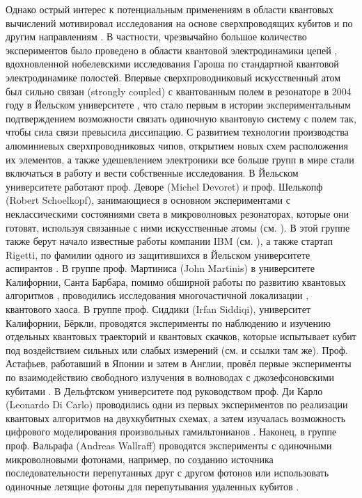 \documentclass[14pt, a4paper]{extarticle}
\begin{document}
Однако острый интерес к потенциальным применениям в области квантовых вычислений мотивировал исследования на основе сверхпроводящих кубитов и по другим направлениям \cite{kjaergaard2020superconducting}. В частности, чрезвычайно большое количество экспериментов было проведено в области квантовой электродинамики цепей \cite{blais2020quantum}, вдохновленной нобелевскими исследования Гароша \cite{haroche2013nobel} по стандартной квантовой электродинамике полостей. Впервые сверхпроводниковый искусственный атом был сильно связан (strongly coupled) с квантованным полем в резонаторе в 2004 году в Йельском университете \cite{wallraff2004strong}, что стало первым в истории экспериментальным подтверждением возможности связать одиночную квантовую систему с полем так, чтобы сила связи превысила диссипацию. С развитием технологии производства алюминиевых сверхпроводниковых чипов, открытием новых схем расположения их элементов, а также удешевлением электроники все больше групп в мире стали включаться в работу и вести собственные исследования. В Йельском университете работают проф. Деворе (Michel Devoret) и проф. Шелькопф (Robert Schoelkopf), занимающиеся в основном экспериментами с неклассическими состояниями света в микроволновых резонаторах, которые они готовят, используя связанные с ними искусственные атомы (см. \cite{vlastakis2013deterministically, mirrahimi2014dynamically}). В этой группе также берут начало известные работы компании IBM (см. \cite{jurcevic2020demonstration}), а также стартап Rigetti, по фамилии одного из защитившихся в Йельском университете аспирантов \cite{reagor2018demonstration}. В группе проф. Мартиниса (John Martinis) в университете Калифорнии, Санта Барбара, помимо обширной работы по развитию квантовых алгоритмов \cite{arute2019quantum}, проводились исследования многочастичной локализации \cite{chen2014emulating, roushan2017spectroscopic}, квантового хаоса. В группе проф. Сиддики (Irfan Siddiqi), университет Калифорнии, Бёркли, проводятся эксперименты по наблюдению и изучению отдельных квантовых траекторий и квантовых скачков, которые испытывает кубит под воздействием сильных или слабых измерений (см. \cite{hacohen2016quantum} и ссылки там же). Проф. Астафьев, работавший в Японии и затем в Англии, провёл первые эксперименты по взаимодействию свободного излучения в волноводах с джозефсоновскими кубитами \cite{astafiev2010resonance}. В Дельфтском университете под руководством проф. Ди Карло (Leonardo Di Carlo) проводились одни из первых экспериментов по реализации квантовых алгоритмов на двухкубитных схемах, а затем изучалась возможность цифрового моделирования произвольных гамильтонианов \cite{langford2017experimentally}. Наконец, в группе проф. Вальрафа (Andreas Wallraff) проводятся эксперименты с одиночными микроволновыми фотонами, например, по созданию источника последовательности перепутанных друг с другом фотонов \cite{besse2020realizing} или использовать одиночные летящие фотоны для перепутывания удаленных кубитов \cite{kurpiers2018deterministic}.
\end{document}
